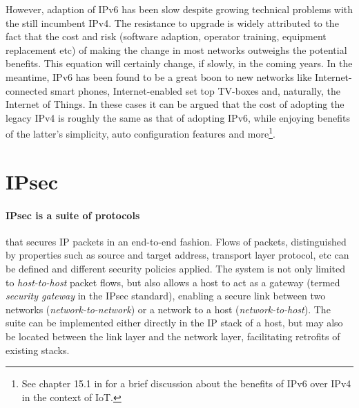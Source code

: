 \documentclass[final,a4paper,twoside,11pt,onecolumn]{report}
\begin{document}
However, adaption of IPv6 has been slow despite growing technical problems with the still incumbent IPv4. The resistance to upgrade is widely attributed to the fact that the cost and risk (software adaption, operator training, equipment replacement etc) of making the change in most networks outweighs the potential benefits. This equation will certainly change, if slowly, in the coming years. In the meantime, IPv6 has been found to be a great boon to new networks like Internet-connected smart phones, Internet-enabled set top TV-boxes and, naturally, the Internet of Things. In these cases it can be argued that the cost of adopting the legacy IPv4 is roughly the same as that of adopting IPv6, while enjoying benefits of the latter's simplicity, auto configuration features and more\footnote{See chapter 15.1 in \cite{vasseur10interconnecting} for a brief discussion about the benefits of IPv6 over IPv4 in the context of IoT.}.


\section{IPsec}

\paragraph{IPsec is a suite of protocols} that secures IP packets in an end-to-end fashion. Flows of packets, distinguished by properties such as source and target address, transport layer protocol, etc can be defined and different security policies applied. The system is not only limited to \emph{host-to-host} packet flows, but also allows a host to act as a gateway (termed \emph{security gateway} in the IPsec standard), enabling a secure link between two networks (\emph{network-to-network}) or a network to a host (\emph{network-to-host}). The suite can be implemented either directly in the IP stack of a host, but may also be located between the link layer and the network layer\citep[section 3.3]{rfc4301}, facilitating retrofits of existing stacks.
\end{document}
